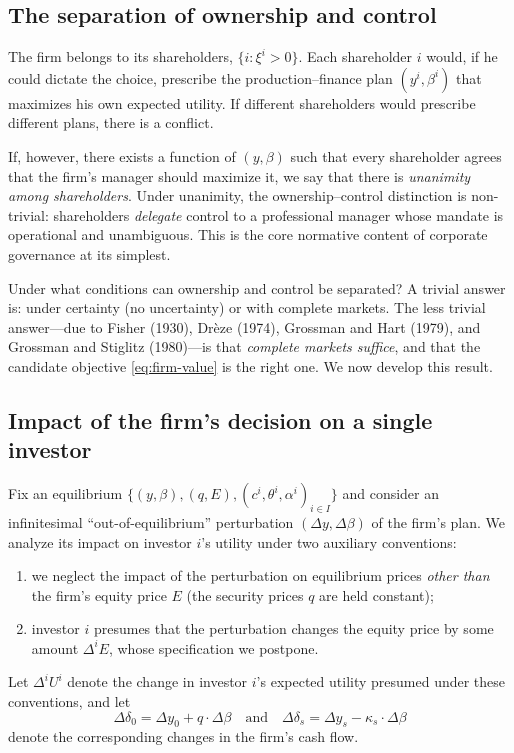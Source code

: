 \documentclass[11pt,a4paper]{article}
\def\et{\quad \text{and} \quad}
\theoremstyle{plain}
\theoremstyle{definition}
\theoremstyle{remark}
\begin{document}
\subsection{The separation of ownership and control}

The firm belongs to its shareholders, $\{i:\xi^i>0\}$. Each shareholder $i$ would, if he could dictate the choice, prescribe the production--finance plan $(y^i,\beta^i)$ that maximizes his own expected utility. If different shareholders would prescribe different plans, there is a conflict.

If, however, there exists a function of $(y,\beta)$ such that every shareholder agrees that the firm's manager should maximize it, we say that there is \emph{unanimity among shareholders}. Under unanimity, the ownership--control distinction is non-trivial: shareholders \emph{delegate} control to a professional manager whose mandate is operational and unambiguous. This is the core normative content of corporate governance at its simplest.

Under what conditions can ownership and control be separated? A trivial answer is: under certainty (no uncertainty) or with complete markets. The less trivial answer---due to Fisher (1930), Drèze (1974), Grossman and Hart (1979), and Grossman and Stiglitz (1980)---is that \emph{complete markets suffice}, and that the candidate objective \eqref{eq:firm-value} is the right one. We now develop this result.

\subsection{Impact of the firm's decision on a single investor}

Fix an equilibrium $\{(y,\beta),(q,E),(c^i,\theta^i,\alpha^i)_{i\in I}\}$ and consider an infinitesimal ``out-of-equilibrium'' perturbation $(\Delta y,\Delta\beta)$ of the firm's plan. We analyze its impact on investor $i$'s utility under two auxiliary conventions:
\begin{enumerate}
  \item we neglect the impact of the perturbation on equilibrium prices \emph{other than} the firm's equity price $E$ (the security prices $q$ are held constant);
  \item investor $i$ presumes that the perturbation changes the equity price by some amount $\Delta^i E$, whose specification we postpone.
\end{enumerate}

Let $\Delta^i U^i$ denote the change in investor $i$'s expected utility presumed under these conventions, and let
\[
  \Delta\delta_0 = \Delta y_0 + q\cdot\Delta\beta
  \et
  \Delta\delta_s = \Delta y_s - \kappa_s\cdot\Delta\beta
\]
denote the corresponding changes in the firm's cash flow.
\end{document}
